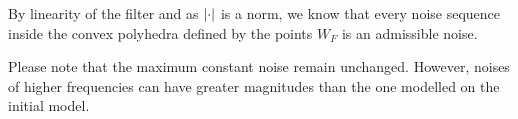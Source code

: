 By linearity of the filter and as $\left|\cdot\right|$ is a norm, we know that every noise sequence inside the convex polyhedra defined by the points $W_F$ is an admissible noise.

Please note that the maximum constant noise remain unchanged. However, noises of higher frequencies can have greater magnitudes than the one modelled on the initial model. 

